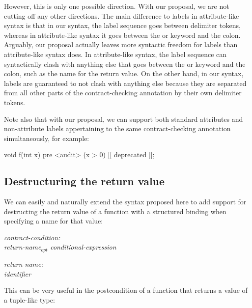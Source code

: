 However, this is only one possible direction. With our proposal, we are not cutting off any other directions. The main difference to labels in attribute-like syntax is that in our syntax, the label sequence goes between delimiter tokens, whereas in attribute-like syntax it goes between the  or  keyword and the colon. Arguably, our proposal actually leaves more syntactic freedom for labels than attribute-like syntax does. In attribute-like syntax, the label sequence can syntactically clash with anything else that goes between the  or  keyword and the colon, such as the name for the return value. On the other hand, in our syntax, labels are guaranteed to not clash with anything else because they are separated from all other parts of the contract-checking annotation by their own delimiter tokens.

Note also that with our proposal, we can support both standard attributes and non-attribute labels appertaining to the same contract-checking annotation simultaneously, for example:

\vspace{2mm}
\begin{codeblock}
void f(int x)
  pre <audit> (x > 0) [[ deprecated ]];
\end{codeblock}
\vspace{2mm}


\subsection{Destructuring the return value}
\label{subsec:struct}

We can easily and naturally extend the syntax proposed here to add support for destructing the return value of a function with a structured binding when specifying a name for that value:

\emph{contract-condition:} \\
\phantom{~~~}\tcode{(} \emph{return-name}$_{opt}$ \emph{conditional-expression} \tcode{)}

\emph{return-name:}\\
\phantom{~~~}\emph{identifier} \tcode{:} \\
\phantom{~~~}

This can be very useful in the postcondition of a function that returns a value of a tuple-like type:

